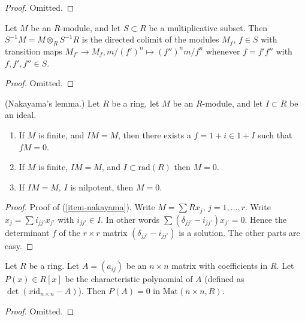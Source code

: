 \begin{proof}
Omitted.
\end{proof}

\begin{lemma}
\label{lemma-localize-colimit}
Let $M$ be an $R$-module, and let $S \subset R$ be
a multiplicative subset. Then $S^{-1}M = M\otimes_R S^{-1}R$
is the directed colimit of the modules $M_f$, $f\in S$ with
transition maps $M_{f'} \to M_f, m/(f')^n \mapsto (f'')^n m/f^n$
whenever $f = f' f''$ with $f, f', f''\in S$.
\end{lemma}

\begin{proof}
Omitted.
\end{proof}

\begin{lemma}
\label{lemma-NAK}
(Nakayama's lemma.)
Let $R$ be a ring, let $M$ be an $R$-module, and let $I \subset R$
be an ideal.
\begin{enumerate}
\item If $M$ is finite, and $IM = M$, then there exists a
$f = 1 + i \in 1 + I$ such that $fM = 0$.
\label{item-nakayama}
\item If $M$ is finite, $IM = M$, and $I \subset \text{rad}(R)$
then $M = 0$.
\item If $IM = M$, $I$ is nilpotent, then $M = 0$.
\end{enumerate}
\end{lemma}

\begin{proof}
Proof of (\ref{item-nakayama}). Write $M = \sum Rx_j$, $j = 1, \ldots, r$.
Write $x_j = \sum i_{jj'} x_{j'}$ with $i_{jj'} \in I$.
In other words $\sum (\delta_{jj'} - i_{jj'})x_{j'} = 0$.
Hence the determinant $f$ of the $r\times r$ matrix
$(\delta_{jj'} - i_{jj'})$ is a solution. The other parts are easy.
\end{proof}


\begin{lemma}
\label{lemma-charpoly}
Let $R$ be a ring. Let $A = (a_{ij})$ be an $n\times n$
matrix with coefficients in $R$. Let $P(x) \in R[x]$
be the characteristic polynomial of $A$ (defined
as $\det(x\text{id}_{n\times n} - A)$).
Then $P(A) = 0$ in $\text{Mat}(n\times n, R)$.
\end{lemma}

\begin{proof}
Omitted.
\end{proof}

















